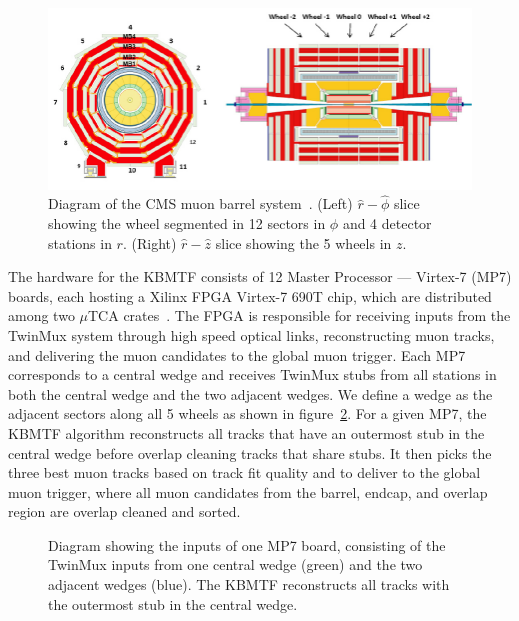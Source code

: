 \begin{figure}[htb!]
	\centering
	\includegraphics[width=.85\linewidth]{figs/04_muons/muon_barrel.png}
	\caption[Diagram of the CMS muon barrel system. (Left) $\hat{r}-\hat{\phi}$ slice showing the wheel segmented in 12 sectors in $\phi$ and 4 detector stations in $r$. (Right) $\hat{r}-\hat{z}$ slice showing the 5 wheels in $z$.]{Diagram of the CMS muon barrel system~\cite{Chatrchyan_2010}. (Left) $\hat{r}-\hat{\phi}$ slice showing the wheel segmented in 12 sectors in $\phi$ and 4 detector stations in $r$. (Right) $\hat{r}-\hat{z}$ slice showing the 5 wheels in $z$.}
	\label{fig:mu_barrel}
\end{figure}

The hardware for the KBMTF consists of 12 Master Processor --- Virtex-7 (MP7) boards, each hosting a Xilinx FPGA Virtex-7 690T chip, which are distributed among two $\mu$TCA crates~\cite{bmtf_hardware}. The FPGA is responsible for receiving inputs from the TwinMux system through high speed optical links, reconstructing muon tracks, and delivering the muon candidates to the global muon trigger. Each MP7 corresponds to a central wedge and receives TwinMux stubs from all stations in both the central wedge and the two adjacent wedges. We define a wedge as the adjacent sectors along all 5 wheels as shown in figure~\ref{fig:mu_wedge}. For a given MP7, the KBMTF algorithm reconstructs all tracks that have an outermost stub in the central wedge before overlap cleaning tracks that share stubs. It then picks the three best muon tracks based on track fit quality and \pt to deliver to the global muon trigger, where all muon candidates from the barrel, endcap, and overlap region are overlap cleaned and sorted.

\begin{figure}[htb!]
	\centering
	
	\caption[Diagram showing the inputs of one MP7 board, consisting of the TwinMux inputs from one central wedge (green) and the two adjacent wedges (blue). The KBMTF reconstructs all tracks with the outermost stub in the central wedge.]{Diagram showing the inputs of one MP7 board, consisting of the TwinMux inputs from one central wedge (green) and the two adjacent wedges (blue). The KBMTF reconstructs all tracks with the outermost stub in the central wedge.}
	\label{fig:mu_wedge}
\end{figure}

